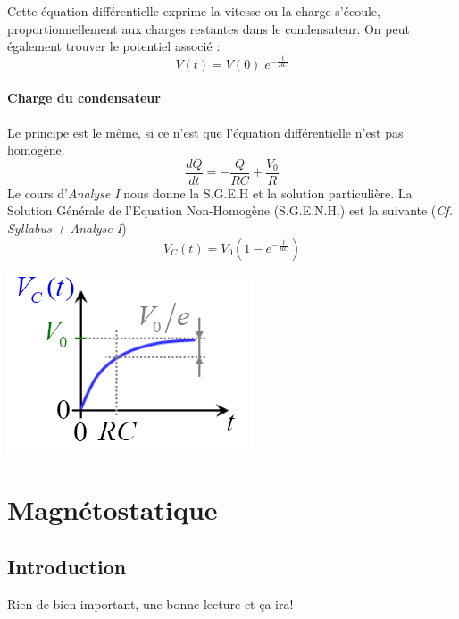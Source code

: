 \documentclass	[11pt, a4paper, openany]{book}
\begin{document}
Cette équation différentielle exprime la vitesse ou la charge s'écoule, proportionnellement aux charges restantes dans le condensateur. On peut également trouver le potentiel associé :
\begin{equation}
	V(t) = V(0).e^{-\frac{t}{RC}}
\end{equation}
\subsubsection{Charge du condensateur}
Le principe est le même, si ce n'est que l'équation différentielle n'est pas homogène.
\begin{equation}
	\frac{dQ}{dt} = -\frac{Q}{RC} + \frac{V_0}{R}
\end{equation}
Le cours d'\textit{Analyse I} nous donne la S.G.E.H et la solution particulière. La Solution Générale de l'Equation Non-Homogène (S.G.E.N.H.) est la suivante (\textit{Cf. Syllabus + Analyse I})
\begin{equation}
	V_C(t) = V_0\left(1 - e^{-\frac{t}{RC}} \right)
\end{equation}
\begin{center}
	\includegraphics[scale=0.6]{es/image21.png}
\end{center}














\chapter{Magnétostatique}
\section{Introduction}
Rien de bien important, une bonne lecture et ça ira!
\end{document}
